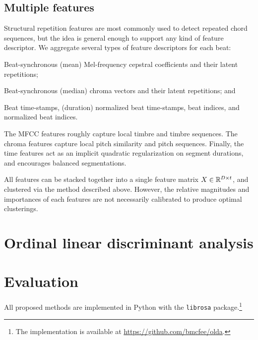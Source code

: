 \documentclass{article}
\begin{document}
\subsection{Multiple features}
Structural repetition features are most commonly used to detect repeated chord sequences, but the idea is general enough to
support any kind of feature descriptor.  We aggregate several types of feature descriptors for each beat:
\begin{description}\addtolength{\itemsep}{-0.5\baselineskip}%
\item[MFCC]   Beat-synchronous (mean) Mel-frequency cepstral coefficients and their latent repetitions;
\item[Chroma] Beat-synchronous (median) chroma vectors and their latent repetitions; and
\item[Time]   Beat time-stamps, (duration) normalized beat time-stamps, beat indices, and normalized beat indices.
\end{description}
The MFCC features roughly capture local timbre and timbre sequences. The chroma features capture local pitch similarity and pitch
sequences. Finally, the time features act as an implicit quadratic regularization on segment durations, and encourages
balanced segmentations.

All features can be stacked together into a single feature matrix $X \in \mathbb{R}^{D\times t}$, and clustered via the method described
above. However, the relative magnitudes and importances of each features are not necessarily calibrated to produce optimal
clusterings. 

\section{Ordinal linear discriminant analysis}
\label{sec:olda}

\cite{fisher1936use, fukunaga1990introduction}

\section{Evaluation}
\label{sec:eval}
All proposed methods are implemented in Python with the \texttt{librosa} package.\footnote{The implementation is
available at \url{https://github.com/bmcfee/olda}.}
\end{document}
